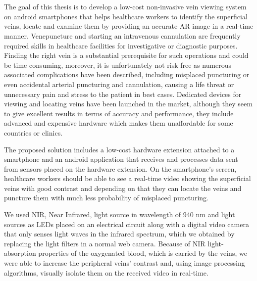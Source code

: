 \chapter{\abstractname}
 


The goal of this thesis is to develop a low-cost non-invasive vein viewing system on android smartphones that helps healthcare workers to identify the superficial veins, locate and examine them by providing an accurate AR image in a real-time manner. 
Venepuncture and starting an intravenous cannulation are frequently required skills in healthcare facilities for investigative or diagnostic purposes. Finding the right vein is a substantial prerequisite for such operations and could be time consuming, moreover, it is unfortunately not risk free as numerous associated complications have been described, including misplaced puncturing or even accidental arterial puncturing and cannulation, causing a life threat or unnecessary pain and stress to the patient in best cases.  
Dedicated devices for viewing and locating veins have been launched in the market, although they seem to give excellent results in terms of accuracy and performance, they include advanced and expensive hardware which makes them unaffordable for some countries or clinics.  

The proposed solution includes a low-cost hardware extension attached to a smartphone and an android application that receives and processes data sent from sensors placed on the hardware extension. On the smartphone’s screen, healthcare workers should be able to see a real-time video showing the superficial veins with good contrast and depending on that they can locate the veins and puncture them with much less probability of misplaced puncturing. 

We used NIR, Near Infrared, light source in wavelength of 940 nm and light sources as LEDs placed on an electrical circuit along with a digital video camera that only senses light waves in the infrared spectrum, which we obtained by replacing the light filters in a normal web camera. Because of NIR light-absorption properties of the oxygenated blood, which is carried by the veins, we were able to increase the peripheral veins’ contrast and, using image processing algorithms, visually isolate them on the received video in real-time.


